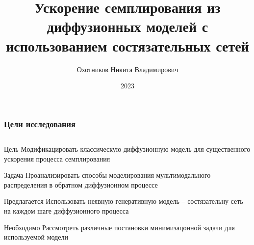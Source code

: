 \documentclass[8pt]{beamer}
\title[]{Ускорение семплирования из диффузионных моделей с использованием состязательных сетей}
\author{Охотников Никита Владимирович}
\institute{МФТИ}
\date{2023}
\begin{document}
\begin{frame}
  \titlepage
\end{frame}


\begin{frame}
	\frametitle{Цели исследования}
	
	\begin{columns}
		\begin{column}{0.9\textwidth}
	
			\begin{block}{Цель}
				\smallskip
			Модификацировать классическую диффузионную модель для существенного ускорения процесса семплирования
			\end{block}	
		
			\bigskip
		
			\begin{block}{Задача}
					\smallskip
				Проанализировать способы моделирования мультимодального распределения в обратном диффузионном процессе
			\end{block}	
		
			\bigskip
			
			\begin{block}{Предлагается}
				\smallskip
				Использовать неявную генеративную модель -- состязательну сеть на каждом шаге диффузионного процесса
			\end{block}	
		
			\bigskip
		
			\begin{block}{Необходимо}
				\smallskip
				Рассмотреть различные постановки минимизацонной задачи для используемой модели
			\end{block}	

	     \end{column}
	\end{columns}


\end{frame}
\end{document}
